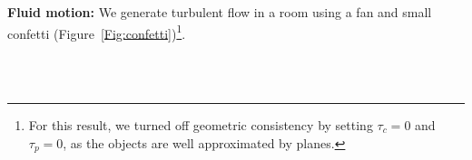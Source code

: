 \textbf{Fluid motion:} We generate turbulent flow in a room using a fan and small confetti (Figure~\ref{Fig:confetti})\footnote{For this result, we turned off geometric consistency by setting $\tau_c = 0$ and $\tau_p = 0$, as the objects are well approximated by planes.}. 


\begin{figure}[t]
	\centering       
	\\
	\\

\end{figure}
